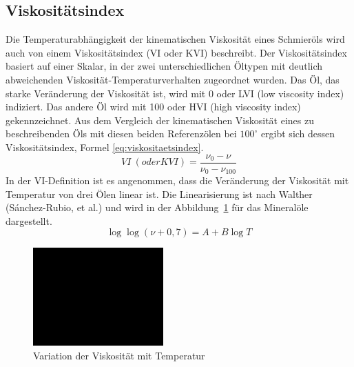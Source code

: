 \subsection*{Viskositätsindex}
\label{sub:Viskositaetsindex}
Die Temperaturabhängigkeit der kinematischen Viskosität eines Schmieröls wird auch von einem Viskositätsindex (VI oder KVI) beschreibt.
Der Viskositätsindex basiert auf einer Skalar, in der zwei unterschiedlichen Öltypen mit deutlich abweichenden Viskosität-Temperaturverhalten zugeordnet wurden.
Das Öl, das starke Veränderung der Viskosität ist, wird mit 0 oder LVI (low viscosity index) indiziert.
Das andere Öl wird mit 100 oder HVI (high viscosity index) gekennzeichnet.
Aus dem Vergleich der kinematischen Viskosität eines zu beschreibenden Öls mit diesen beiden Referenzölen bei $100^\circ$  ergibt sich dessen Viskositätsindex, Formel \ref{eq:viskositaetsindex}.
\begin{equation}
    VI~(oder KVI) = \frac{\nu_0 - \nu}{\nu_0 - \nu_{100}}
    \label{eq:viskositaetsindex}
\end{equation}
%
In der VI-Definition ist es angenommen, dass die Veränderung der Viskosität mit Temperatur von drei Ölen linear ist.
Die Linearisierung ist nach Walther (S\'{a}nchez-Rubio, et al.)\cite{sanchez-rubio} und wird in der Abbildung~\ref{fig:variation_der_viskositaet_mit_temperatur} für das Mineralöle dargestellt.
\begin{equation}
    \label{eq:kinematische_viskotitaet_walther}
    \log \log(\nu + 0,7) = A + B \log T
\end{equation}
%
\begin{figure}[htb]
    \centering
    \includegraphics[width=5cm]{./images/blank_img.jpg}
    \caption{Variation der Viskosität mit Temperatur}
    \label{fig:variation_der_viskositaet_mit_temperatur}
\end{figure}

